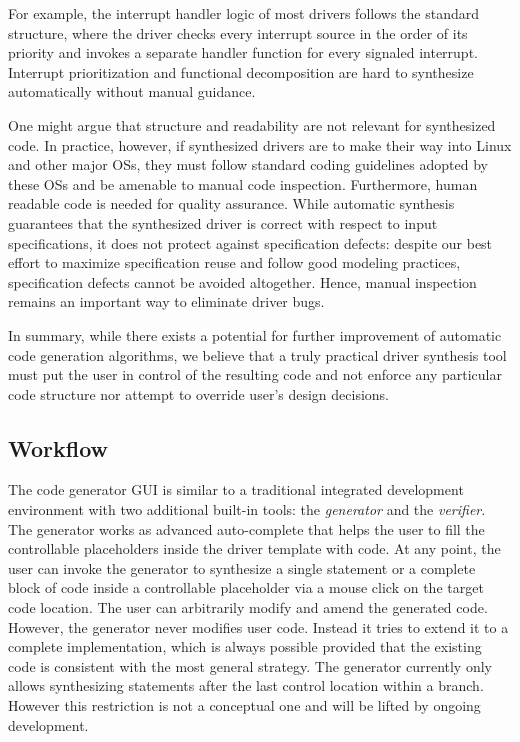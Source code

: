 For example, the interrupt handler logic of most drivers follows the standard structure, where the driver checks every interrupt source in the order of its priority and invokes a separate handler function for every signaled interrupt.  Interrupt prioritization and functional decomposition are hard to synthesize automatically without manual guidance.

One might argue that structure and readability are not relevant for synthesized code.  In practice, however, if synthesized drivers are to make their way into Linux and other major OSs, they must follow standard coding guidelines adopted by these OSs and be amenable to manual code inspection.  Furthermore, human readable code is needed for quality assurance.  While automatic synthesis guarantees that the synthesized driver is correct with respect to input specifications, it does not protect against specification defects: despite our best effort to maximize specification reuse and follow good modeling practices, specification defects cannot be avoided altogether.  Hence, manual inspection remains an important way to eliminate driver bugs.

In summary, while there exists a potential for further improvement of automatic code generation algorithms, we believe that a truly practical driver synthesis tool must put the user in control of the resulting code and not enforce any particular code structure nor attempt to override user's design decisions.

\subsection{Workflow}

The \termite code generator GUI is similar to a traditional integrated development environment with two additional built-in tools: the \emph{generator} and the \emph{verifier}.  The generator works as advanced auto-complete that helps the user to fill the controllable placeholders inside the driver template with code.  At any point, the user can invoke the generator to synthesize a single statement or a complete block of code inside a controllable placeholder via a mouse click on the target code location.  The user can arbitrarily modify and amend the generated code.  However, the generator never modifies user code.  Instead it tries to extend it to a complete implementation, which is always possible provided that the existing code is consistent with the most general strategy.  The generator currently only allows synthesizing statements after the last control location within a branch.  However this restriction is not a conceptual one and will be lifted by ongoing development.

